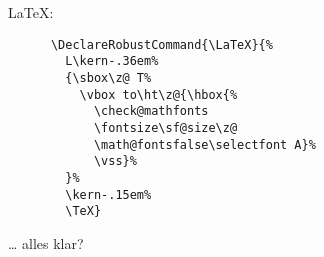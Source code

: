 \begin{frame}[fragile]
  \centering
  {\Huge \LaTeX:}

  \vspace{10pt}
  \centering
  \begin{minipage}{0.5\textwidth}
    \begin{verbatim}
      \DeclareRobustCommand{\LaTeX}{%
        L\kern-.36em%
        {\sbox\z@ T%
          \vbox to\ht\z@{\hbox{%
            \check@mathfonts
            \fontsize\sf@size\z@
            \math@fontsfalse\selectfont A}%
            \vss}%
        }%
        \kern-.15em%
        \TeX}
    \end{verbatim}
  \end{minipage}

  \begin{center}
    \Huge
    … alles klar?
  \end{center}
\end{frame}
